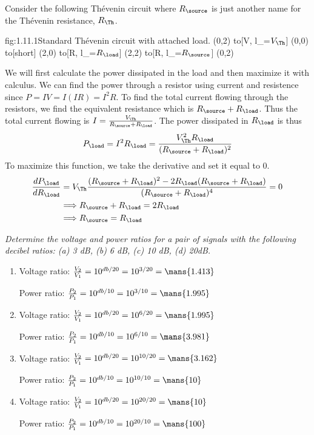 \documentclass{article}
\begin{document}
    Consider the following Th\'evenin circuit where $R_\source$ is just another name for the Th\'evenin resistance, $R_\Th$.
    \begin{circuit}{fig:1.11.1}{Standard Th\'evenin circuit with attached load.}
        (0,2) to[V, l_=$V_\Th$] (0,0)
            to[short] (2,0)
            to[R, l_=$R_\load$] (2,2)
            to[R, l_=$R_\source$] (0,2)
    \end{circuit}
    We will first calculate the power dissipated in the load and then maximize it with calculus. We can find the power through a resistor using current and resistence since $P = IV = I(IR) = I^2R$. To find the total current flowing through the resistors, we find the equivalent resistance which is $R_\source + R_\load$. Thus the total current flowing is $I = \frac{V_\Th}{R_\source + R_\load}$. The power dissipated in $R_\load$ is thus 
    \[P_\load = I^2R_\load = \frac{V_\Th^2 R_\load}{(R_\source + R_\load)^2}\]
    To maximize this function, we take the derivative and set it equal to 0.
    \begin{align*}
        \frac{dP_\load}{dR_\load} &= V_\Th \frac{(R_\source + R_\load)^2 - 2R_\load(R_\source + R_\load)}{(R_\source + R_\load)^4} = 0 \\
        &\Longrightarrow R_\source + R_\load = 2R_\load \\
        &\Longrightarrow R_\source = R_\load
    \end{align*}

    \textit{Determine the voltage and power ratios for a pair of signals with the following decibel ratios: (a) 3 dB, (b) 6 dB, (c) 10 dB, (d) 20dB.}
    \begin{enumerate}
        \item 
        Voltage ratio: $\frac{V_2}{V_1} = 10^{db/20} = 10^{3/20} = \mans{1.413}$

        Power ratio: $\frac{P_2}{P_1} = 10^{db/10} = 10^{3/10} = \mans{1.995}$

        \item 
        Voltage ratio: $\frac{V_2}{V_1} = 10^{db/20} = 10^{6/20} = \mans{1.995}$

        Power ratio: $\frac{P_2}{P_1} = 10^{db/10} = 10^{6/10} = \mans{3.981}$
        
        \item 
        Voltage ratio: $\frac{V_2}{V_1} = 10^{db/20} = 10^{10/20} = \mans{3.162}$

        Power ratio: $\frac{P_2}{P_1} = 10^{db/10} = 10^{10/10} = \mans{10}$
        
        \item 
        Voltage ratio: $\frac{V_2}{V_1} = 10^{db/20} = 10^{20/20} = \mans{10}$

        Power ratio: $\frac{P_2}{P_1} = 10^{db/10} = 10^{20/10} = \mans{100}$
    \end{enumerate}
\end{document}
